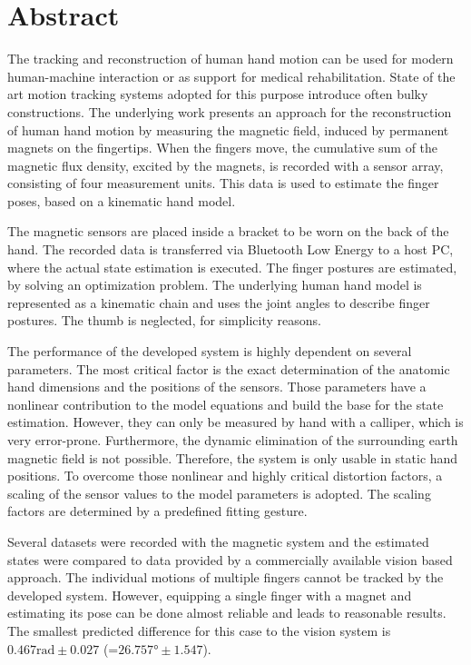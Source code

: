 
\chapter*{Abstract}

The tracking and reconstruction of human hand motion can be used for modern human-machine interaction or as support for medical rehabilitation. State of the art motion tracking systems adopted for this purpose introduce often bulky constructions.  
The underlying work presents an approach for the reconstruction of human hand motion by measuring the magnetic field, induced by permanent magnets on the fingertips. When the fingers move, the cumulative sum of the magnetic flux density, excited by the magnets, is recorded with a sensor array, consisting of four measurement units. This data is used to estimate the finger poses, based on a kinematic hand model. 

The magnetic sensors are placed inside a bracket to be worn on the back of the hand. The recorded data is transferred via Bluetooth Low Energy to a host PC, where the actual state estimation is executed. The finger postures are estimated, by solving an optimization problem. The underlying human hand model is represented as a kinematic chain and uses the joint angles to describe finger postures. The thumb is neglected, for simplicity reasons. 

The performance of the developed system is highly dependent on several parameters. The most critical factor is the exact determination of the anatomic hand dimensions and the positions of the sensors. Those parameters have a nonlinear contribution to the model equations and build the base for the state estimation. However, they can only be measured by hand with a calliper, which is very error-prone. Furthermore, the dynamic elimination of the surrounding earth magnetic field is not possible. Therefore, the system is only usable in static hand positions. To overcome those nonlinear and highly critical distortion factors, a scaling of the sensor values to the model parameters is adopted. The scaling factors are determined by a predefined fitting gesture.

Several datasets were recorded with the magnetic system and the estimated states were compared to data provided by a commercially available vision based approach. The individual motions of multiple fingers cannot be tracked by the developed system. However, equipping a single finger with a magnet and estimating its pose can be done almost reliable and leads to reasonable results. The smallest predicted difference for this case to the vision system is $ 0.467 \si{\radian} \pm 0.027 $ (=$ 26.757 \si{\degree} \pm 1.547 $).


